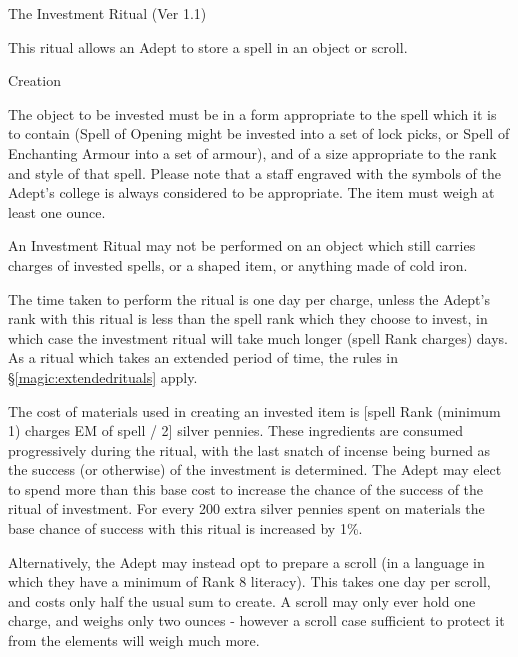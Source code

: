 \begin{multicols}{3}
\begin{ritual}[]{The Investment Ritual (Ver 1.1)}
\label{investment}


This ritual allows an Adept to store a spell in an object or scroll.

\begin{Description}
\item[Creation]

The object to be invested must be in a form appropriate to the spell
which it is to contain (\eg Spell of Opening might be invested into
a set of lock picks, or Spell of Enchanting Armour into a set of
armour), and of a size appropriate to the rank and style of that
spell. Please note that a staff engraved with the symbols of the
Adept's college is always considered to be appropriate. The item must
weigh at least one ounce.

An Investment Ritual may not be performed on an object which still
carries charges of invested spells, or a shaped item, or anything made
of cold iron.

The time taken to perform the ritual is one day per charge, unless the
Adept's rank with this ritual is less than the spell rank which they
choose to invest, in which case the investment ritual will take much
longer (spell Rank \x charges) days.  As a ritual which takes an
extended period of time, the rules in \S\ref{magic:extendedrituals}
apply.

The cost of materials used in creating an invested item is [spell Rank
(minimum 1) \x charges \x EM of spell / 2] silver pennies.
These ingredients are consumed progressively during the ritual, with
the last snatch of incense being burned as the success (or otherwise)
of the investment is determined. The Adept may elect to spend more
than this base cost to increase the chance of the success of the
ritual of investment. For every 200 extra silver pennies spent on
materials the base chance of success with this ritual is increased by
1\%.

Alternatively, the Adept may instead opt to prepare a scroll (in a
language in which they have a minimum of Rank 8 literacy). This takes
one day per scroll, and costs only half the usual sum to create.  A
scroll may only ever hold one charge, and weighs only two ounces -
however a scroll case sufficient to protect it from the elements will
weigh much more.


\end{Description}
\end{ritual}
\end{multicols}
